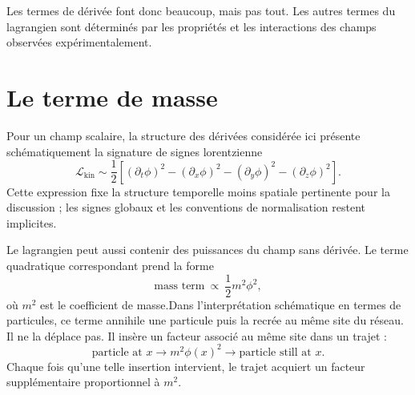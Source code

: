 \begin{classroomqa}
\end{classroomqa}


Les termes de dérivée font donc beaucoup, mais pas tout. Les autres termes du lagrangien sont déterminés par les propriétés et les interactions des champs observées expérimentalement.

\section{Le terme de masse}

Pour un champ scalaire, la structure des dérivées considérée ici présente schématiquement la signature de signes lorentzienne
\begin{equation}
\mathcal{L}_{\mathrm{kin}}
\sim
\frac{1}{2}\left[
(\partial_t\phi)^2
-(\partial_x\phi)^2
-(\partial_y\phi)^2
-(\partial_z\phi)^2
\right].
\end{equation}
Cette expression fixe la structure temporelle moins spatiale pertinente pour la discussion ; les signes globaux et les conventions de normalisation restent implicites.

Le lagrangien peut aussi contenir des puissances du champ sans dérivée. Le terme quadratique correspondant prend la forme
\begin{equation}
\text{mass term}\ \propto\ \frac{1}{2}m^2\phi^2,
\end{equation}
où \(m^2\) est le coefficient de masse.Dans l’interprétation schématique en termes de particules, ce terme annihile une particule puis la recrée au même site du réseau. Il ne la déplace pas. Il insère un facteur associé au même site dans un trajet :
\begin{equation}
\text{particle at }x
\longrightarrow
\boxed{m^2\phi(x)^2}
\longrightarrow
\text{particle still at }x.
\end{equation}
Chaque fois qu’une telle insertion intervient, le trajet acquiert un facteur supplémentaire proportionnel à \(m^2\).

